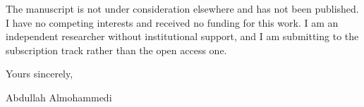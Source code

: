 \documentclass[10.5pt]{letter}
\begin{document}
\vspace{0.5em}
The manuscript is not under consideration elsewhere and has not been
published. I have no competing interests and received no funding for this
work. I am an independent researcher without institutional support, and I am
submitting to the subscription track rather than the open access one.

\vspace{0.9em}
\noindent Yours sincerely,

\vspace{0.6em}
\noindent Abdullah Almohammedi
\end{document}
